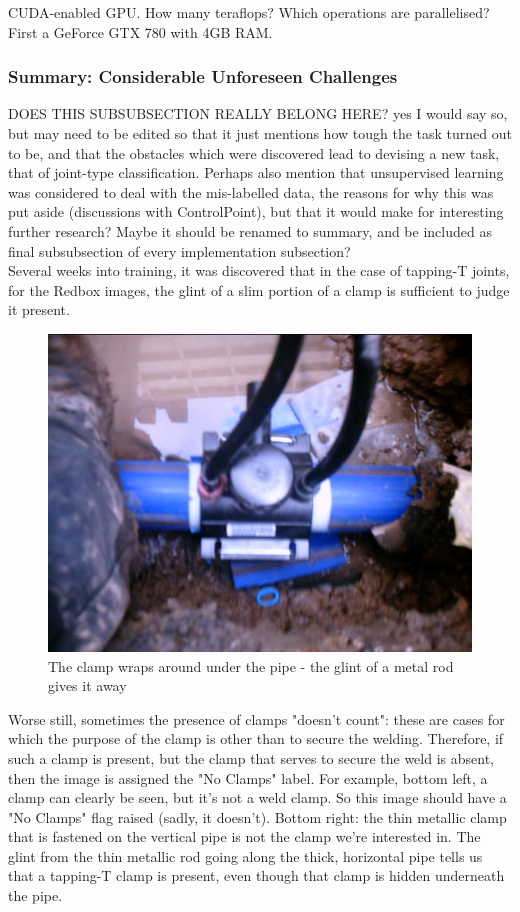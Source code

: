 \documentclass[a4paper,11pt]{article}
\begin{document}
CUDA-enabled GPU. How many teraflops? Which operations are parallelised? 
First a GeForce GTX 780 with 4GB RAM. 

\subsubsection{Summary: Considerable Unforeseen Challenges}

DOES THIS SUBSUBSECTION REALLY BELONG HERE? yes I would say so, but may need to be edited so that it just mentions how tough the task turned out to be, and that the obstacles which were discovered lead to devising a new task, that of joint-type classification. Perhaps also mention that unsupervised learning was considered to deal with the mis-labelled data, the reasons for why this was put aside (discussions with ControlPoint), but that it would make for interesting further research? Maybe it should be renamed to summary, and be included as final subsubsection of every implementation subsection? \\

Several weeks into training, it was discovered that in the case of tapping-T joints, for the Redbox images, the glint of a slim portion of a clamp is sufficient to judge it present. \\

\begin{figure}[h!]
	\centering
	\includegraphics[width=0.35\linewidth]{images/tapping-T.jpg}
	\caption{The clamp wraps around under the pipe - the glint of a metal rod gives it away}
\end{figure}

Worse still, sometimes the presence of clamps "doesn't count": these are cases for which the purpose of the clamp is other than to secure the welding. Therefore, if such a clamp is present, but the clamp that serves to secure the weld is absent, then the image is assigned the "No Clamps" label. For example, bottom left, a clamp can clearly be seen, but it's not a weld clamp. So this image should have a "No Clamps" flag raised (sadly, it doesn't). Bottom right: the thin metallic clamp that is fastened on the vertical pipe is not the clamp we're interested in. The glint from the thin metallic rod going along the thick, horizontal pipe tells us that a tapping-T clamp is present, even though that clamp is hidden underneath the pipe. 
\end{document}
